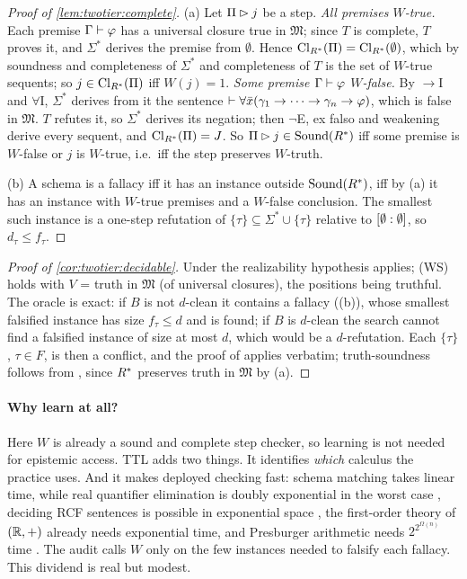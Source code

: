 \begin{proof}[Proof of \cref{lem:twotier:complete}]
(a) Let $\Pi\rhd j$ be a step. \emph{All premises $W$-true.} Each premise $\Gamma\vdash\varphi$ has a universal closure true in $\mathfrak M$; since $T$ is complete, $T$ proves it, and $\Sigma^*$ derives the premise from $\emptyset$. Hence $\mathrm{Cl}_{R^{*}}(\Pi)=\mathrm{Cl}_{R^{*}}(\emptyset)$, which by soundness and completeness of $\Sigma^*$ and completeness of $T$ is the set of $W$-true sequents; so $j\in\mathrm{Cl}_{R^{*}}(\Pi)$ iff $W(j)=1$. \emph{Some premise $\Gamma\vdash\varphi$ $W$-false.} By $\to$I and $\forall$I, $\Sigma^*$ derives from it the sentence $\vdash\forall\bar x(\gamma_1\to\dots\to\gamma_n\to\varphi)$, which is false in $\mathfrak M$. $T$ refutes it, so $\Sigma^*$ derives its negation; then $\neg$E, ex falso and weakening derive every sequent, and $\mathrm{Cl}_{R^{*}}(\Pi)=J$. So $\Pi\rhd j\in\mathrm{Sound}(R^{*})$ iff some premise is $W$-false or $j$ is $W$-true, i.e.\ iff the step preserves $W$-truth.

(b) A schema is a fallacy iff it has an instance outside $\mathrm{Sound}(R^{*})$, iff by (a) it has an instance with $W$-true premises and a $W$-false conclusion. The smallest such instance is a one-step refutation of $\{\tau\}\subseteq\Sigma^*\cup\{\tau\}$ relative to $[\emptyset : \emptyset]$, so $d_\tau\le f_\tau$.
\end{proof}

\begin{proof}[Proof of \cref{cor:twotier:decidable}]
Under the realizability hypothesis  applies; (WS) holds with $V$ = truth in $\mathfrak M$ (of universal closures), the positions being truthful. The oracle is exact: if $B$ is not $d$-clean it contains a fallacy ((b)), whose smallest falsified instance has size $f_\tau\le d$ and is found; if $B$ is $d$-clean the search cannot find a falsified instance of size at most $d$, which would be a $d$-refutation. Each $\{\tau\}$, $\tau\in F$, is then a conflict, and the proof of  applies verbatim; truth-soundness follows from , since $R^{*}$ preserves truth in $\mathfrak M$ by (a).
\end{proof}

\paragraph{Why learn at all?} Here $W$ is already a sound and complete step checker, so learning is not needed for epistemic access. TTL adds two things. It identifies \emph{which} calculus the practice uses. And it makes deployed checking fast: schema matching takes linear time, while real quantifier elimination is doubly exponential in the worst case \citep{davenport1988real}, deciding RCF sentences is possible in exponential space \citep{benor1986complexity}, the first-order theory of $(\mathbb{R},+)$ already needs exponential time, and Presburger arithmetic needs $2^{2^{\Omega(n)}}$ time \citep{fischer1974super}. The audit calls $W$ only on the few instances needed to falsify each fallacy. This dividend is real but modest.

